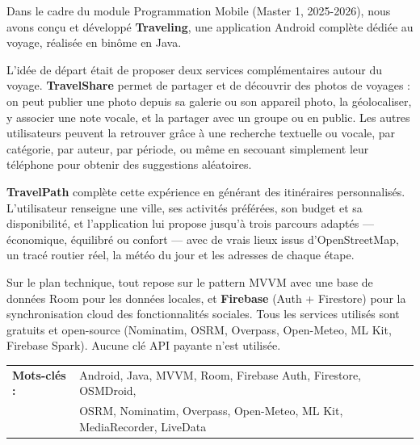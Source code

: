 \documentclass[a4paper,12pt,openany]{report}
\begin{document}
\begin{tcolorbox}[mybox, colback=lightbg, colframe=bord,
  left=14pt, right=14pt, top=12pt, bottom=12pt,
  title=\large\bfseries\color{navy}Résumé]

Dans le cadre du module Programmation Mobile (Master 1, 2025-2026), nous avons
conçu et développé \textbf{Traveling}, une application Android complète dédiée
au voyage, réalisée en binôme en Java.

L'idée de départ était de proposer deux services complémentaires autour du voyage.
\textbf{TravelShare} permet de partager et de découvrir des photos de voyages :
on peut publier une photo depuis sa galerie ou son appareil photo, la géolocaliser,
y associer une note vocale, et la partager avec un groupe ou en public. Les autres
utilisateurs peuvent la retrouver grâce à une recherche textuelle ou vocale, par
catégorie, par auteur, par période, ou même en secouant simplement leur téléphone
pour obtenir des suggestions aléatoires.

\textbf{TravelPath} complète cette expérience en générant des itinéraires personnalisés.
L'utilisateur renseigne une ville, ses activités préférées, son budget et sa disponibilité,
et l'application lui propose jusqu'à trois parcours adaptés — économique, équilibré ou confort —
avec de vrais lieux issus d'OpenStreetMap, un tracé routier réel, la météo du jour
et les adresses de chaque étape.

Sur le plan technique, tout repose sur le pattern MVVM avec une base de données Room
pour les données locales, et \textbf{Firebase} (Auth + Firestore) pour la synchronisation
cloud des fonctionnalités sociales. Tous les services utilisés sont gratuits et open-source
(Nominatim, OSRM, Overpass, Open-Meteo, ML Kit, Firebase Spark). Aucune clé API payante
n'est utilisée.

\vspace{6pt}
\begin{tabular}{ll}
  \textbf{Mots-clés :} &
  Android, Java, MVVM, Room, Firebase Auth, Firestore, OSMDroid, \\
  & OSRM, Nominatim, Overpass, Open-Meteo, ML Kit, MediaRecorder, LiveData
\end{tabular}
\end{tcolorbox}

\clearpage

\end{document}
